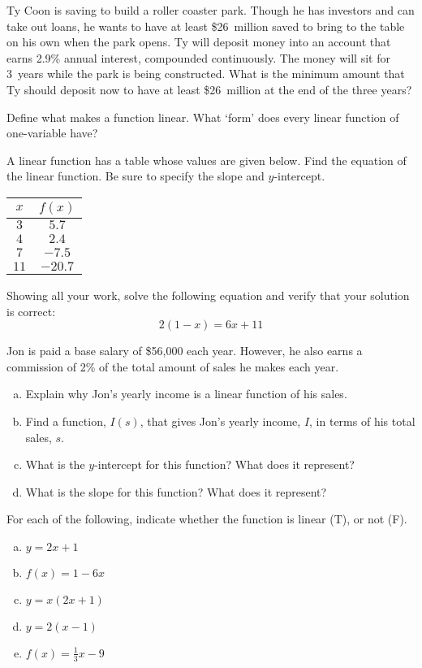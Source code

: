\documentclass[11pt,letterpaper]{article}
\begin{document}
\prob	 Ty Coon is saving to build a roller coaster park. Though he has investors and can take out loans, he wants to have at least \$26~million saved to bring to the table on his own when the park opens. Ty will deposit money into an account that earns 2.9\% annual interest, compounded continuously. The money will sit for 3~years while the park is being constructed. What is the minimum amount that Ty should deposit now to have at least \$26~million at the end of the three years? \pspace


\prob Define what makes a function linear. What `form' does every linear function of one-variable have? \pspace		

\prob A linear function has a table whose values are given below. Find the equation of the linear function. Be sure to specify the slope and $y$-intercept.
	\begin{table}[H]
	\centering
	\begin{tabular}{c|c}
	$x$ & $f(x)$ \\ \hline
	$3$ & $5.7$ \\ 
	$4$ & $2.4$ \\
	$7$ & $-7.5$ \\
	$11$ & $-20.7$
	\end{tabular}
	\end{table} \pspace


\prob Showing all your work, solve the following equation and verify that your solution is correct:
	\[
	2(1 - x)= 6x + 11
	\] \pspace


\prob Jon is paid a base salary of \$56,000 each year. However, he also earns a commission of 2\% of the total amount of sales he makes each year. 
        \begin{enumerate}[(a)]
        \item Explain why Jon's yearly income is a linear function of his sales.
        \item Find a function, $I(s)$, that gives Jon's yearly income, $I$, in terms of his total sales, $s$.
        \item What is the $y$-intercept for this function? What does it represent?
        \item What is the slope for this function? What does it represent? 
        \end{enumerate} \pspace


\prob For each of the following, indicate whether the function is linear (T), or not (F). 
	\begin{enumerate}[(a)]
	\item $y= 2x + 1$
	\item $f(x)= 1 - 6x$
	\item $y= x ( 2x + 1)$
	\item $y= 2(x - 1)$
	\item $f(x)= \frac{1}{3}x - 9$
	\end{enumerate} \pspace
\end{document}
